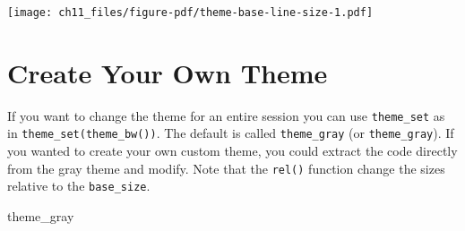 \documentclass[
  letterpaper,
]{scrbook}
\newenvironment{Shaded}{\begin{snugshade}}{\end{snugshade}}
\newcommand{\NormalTok}[1]{\textcolor[rgb]{0.00,0.23,0.31}{#1}}
\begin{document}
\texttt{[image: ch11\_files/figure-pdf/theme-base-line-size-1.pdf]}

\section{Create Your Own Theme}\label{create-your-own-theme}

If you want to change the theme for an entire session you can use
\texttt{theme\_set} as in \texttt{theme\_set(theme\_bw())}. The default
is called \texttt{theme\_gray} (or \texttt{theme\_gray}). If you wanted
to create your own custom theme, you could extract the code directly
from the gray theme and modify. Note that the \texttt{rel()} function
change the sizes relative to the \texttt{base\_size}.

\begin{Shaded}
\begin{Highlighting}[]
\NormalTok{theme\_gray}
\end{Highlighting}
\end{Shaded}
\end{document}
